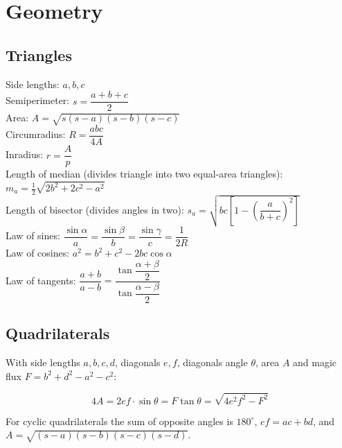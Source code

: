 \section{Geometry}

\subsection{Triangles}
Side lengths: $a,b,c$\\
Semiperimeter: $s=\dfrac{a+b+c}{2}$\\
Area: $A=\sqrt{s(s-a)(s-b)(s-c)}$\\
Circumradius: $R=\dfrac{abc}{4A}$\\
Inradius: $r=\dfrac{A}{p}$\\
Length of median (divides triangle into two equal-area triangles): $m_a=\tfrac{1}{2}\sqrt{2b^2+2c^2-a^2}$\\
Length of bisector (divides angles in two): $s_a=\sqrt{bc\left[1-\left(\dfrac{a}{b+c}\right)^2\right]}$\\
Law of sines: $\dfrac{\sin\alpha}{a}=\dfrac{\sin\beta}{b}=\dfrac{\sin\gamma}{c}=\dfrac{1}{2R}$\\
Law of cosines: $a^2=b^2+c^2-2bc\cos\alpha$\\
Law of tangents: $\dfrac{a+b}{a-b}=\dfrac{\tan\dfrac{\alpha+\beta}{2}}{\tan\dfrac{\alpha-\beta}{2}}$\\

\subsection{Quadrilaterals}
With side lengths $a,b,c,d$, diagonals $e, f$, diagonals angle $\theta$, area $A$ and
magic flux $F=b^2+d^2-a^2-c^2$:

\[ 4A = 2ef \cdot \sin\theta = F\tan\theta = \sqrt{4e^2f^2-F^2} \]

 For cyclic quadrilaterals the sum of opposite angles is $180^\circ$,
$ef = ac + bd$, and $A = \sqrt{(s-a)(s-b)(s-c)(s-d)}$.


